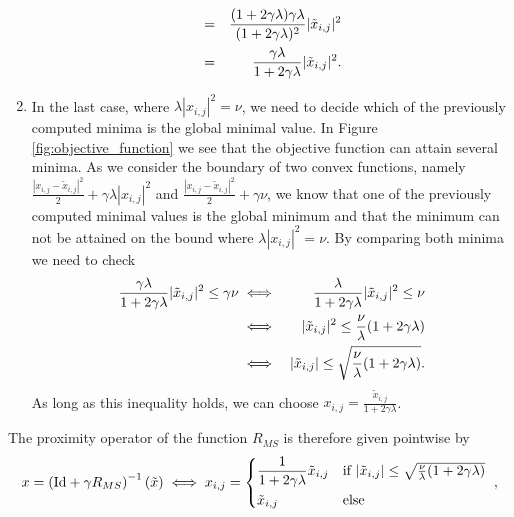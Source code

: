 \documentclass[abstracton]{scrreprt}
\begin{document}
\begin{enumerate}
\begin{eqnarray}
                            &=& \frac{(1 + 2\gamma\lambda)\gamma\lambda}{(1 + 2\gamma\lambda)^{2}} |\tilde{x}_{i,j}|^{2} \notag \\
                            &=& \frac{\gamma\lambda}{1 + 2\gamma\lambda} |\tilde{x}_{i,j}|^{2}. \label{eq:bound_on_p}
                        \end{eqnarray}
                    \item In the last case, where $\lambda |x_{i,j}|^{2} = \nu$, we need to decide which of the previously computed minima is the global minimal value. In Figure \ref{fig:objective_function} we see that the objective function can attain several minima. As we consider the boundary of two convex functions, namely $\frac{|x_{i,j} - \tilde{x}_{i,j}|^{2}}{2} + \gamma \lambda |x_{i,j}|^{2}$ and $\frac{|x_{i,j} - \tilde{x}_{i,j}|^{2}}{2} + \gamma \nu$, we know that one of the previously computed minimal values is the global minimum and that the minimum can not be attained on the bound where $\lambda |x_{i,j}|^{2} = \nu$. By comparing both minima we need to check
                        \begin{eqnarray}
                            \frac{\gamma\lambda}{1 + 2\gamma\lambda} |\tilde{x}_{i,j}|^{2} \le \gamma \nu &\iff& \frac{\lambda}{1 + 2\gamma\lambda} |\tilde{x}_{i,j}|^{2} \le \nu \label{eq:minimal_energy} \\
                            &\iff& |\tilde{x}_{i,j}|^{2} \le \frac{\nu}{\lambda}(1 + 2\gamma\lambda) \notag \\
                            &\iff& |\tilde{x}_{i,j}| \le \sqrt{\frac{\nu}{\lambda}(1 + 2\gamma\lambda)}. \notag
                        \end{eqnarray}
                    As long as this inequality holds, we can choose $x_{i,j} = \frac{\tilde{x}_{i,j}}{1 + 2 \gamma \lambda}$.
                \end{enumerate}
            The proximity operator of the function $R_{MS}$ is therefore given pointwise by
                \begin{equation}
                    x = \left( \textnormal{Id} + \gamma R_{MS} \right)^{-1}(\tilde{x}) \iff x_{i,j} =
                    \begin{dcases*}
                        \frac{1}{1 + 2\gamma\lambda}\tilde{x}_{i,j} & \textnormal{if $|\tilde{x}_{i,j}| \le \sqrt{\frac{\nu}{\lambda}(1 + 2\gamma\lambda)}$} \\
                        \tilde{x}_{i,j} & \textnormal{else}
                    \end{dcases*},
                    \label{eq:proximity_operator_R}
                \end{equation}
\end{document}
